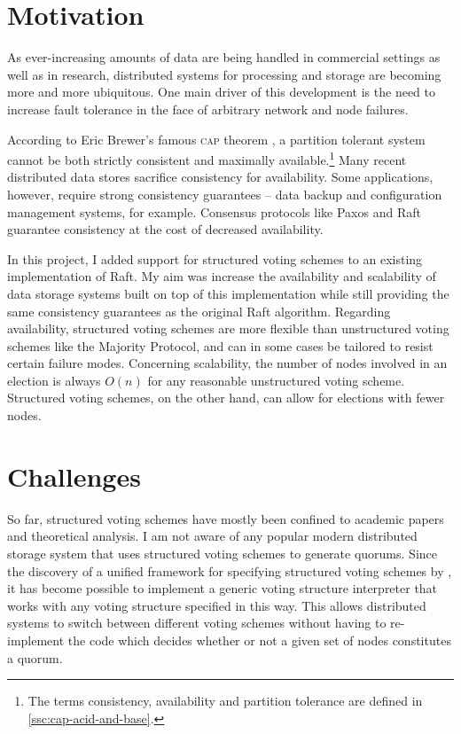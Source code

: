 \documentclass[11pt,chapterprefix=true,toc=bibliography,numbers=noendperiod,
               footnotes=multiple,twoside]{scrreprt}
\begin{document}
\section{Motivation\label{sc:motivation}}

As ever-increasing amounts of data are being handled in commercial settings as well as in research, distributed systems for processing and storage are becoming more and more ubiquitous. One main driver of this development is the need to increase fault tolerance in the face of arbitrary network and node failures.

According to Eric Brewer's famous \textsc{cap} theorem \autocite{cap}, a partition tolerant system cannot be both strictly consistent and maximally available.\footnote{The terms consistency, availability and partition tolerance are defined in \cref{ssc:cap-acid-and-base}.} Many recent distributed data stores sacrifice consistency for availability. Some applications, however, require strong consistency guarantees -- data backup and configuration management systems, for example. Consensus protocols like Paxos \autocite{paxos} and Raft \autocite{raft} guarantee consistency at the cost of decreased availability.

In this project, I added support for structured voting schemes to an existing implementation of Raft. My aim was increase the availability and scalability of data storage systems built on top of this implementation while still providing the same consistency guarantees as the original Raft algorithm. Regarding availability, structured voting schemes are more flexible than unstructured voting schemes like the Majority Protocol, and can in some cases be tailored to resist certain failure modes. Concerning scalability, the number of nodes involved in an election is always \(O(n)\) for any reasonable unstructured voting scheme. Structured voting schemes, on the other hand, can allow for elections with fewer nodes.

\section{Challenges\label{sc:challenges}}

So far, structured voting schemes have mostly been confined to academic papers and theoretical analysis. I am not aware of any popular modern distributed storage system that uses structured voting schemes to generate quorums. Since the discovery of a unified framework for specifying structured voting schemes by \citeauthor{generators},\autocite{generators} it has become possible to implement a generic voting structure interpreter that works with any voting structure specified in this way. This allows distributed systems to switch between different voting schemes without having to re-implement the code which decides whether or not a given set of nodes constitutes a quorum.
\end{document}
